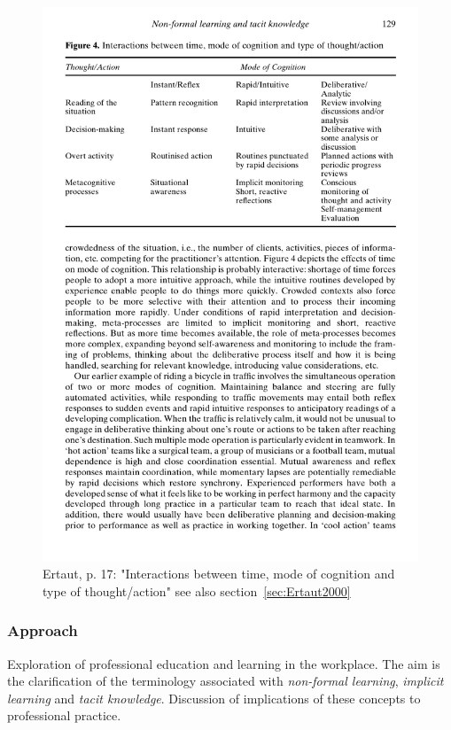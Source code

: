 \documentclass[12pt,a4paper]{article}
\begin{document}
    \begin{figure}[ht]
      \centering
      \includegraphics[width=12cm]{Meeting 4 NON-FORMAL LEARNING - Seite 17.pdf}
      \caption{Ertaut, p. 17: "Interactions between time, mode of cognition and type of thought/action" see also section~\ref{sec:Ertaut2000}}
      \label{fig:Ertaut cognitioninteractions}
    \end{figure}



    \subsubsection{Approach}
      Exploration of professional education and learning in the workplace. The aim is the clarification of the terminology associated with \emph{non-formal learning}, \emph{implicit learning} and \emph{tacit knowledge}. Discussion of implications of these concepts to professional practice.
\end{document}
